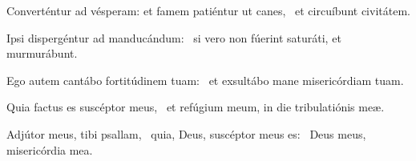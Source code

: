 \item Converténtur ad vésperam: et famem patiéntur ut canes,~\psstar{} et circuíbunt civitátem.

\item Ipsi dispergéntur ad manducándum:~\psstar{} si vero non fúerint saturáti, et murmurábunt.

\item Ego autem cantábo fortitúdinem tuam:~\psstar{} et exsultábo mane misericórdiam tuam.

\item Quia factus es suscéptor meus,~\psstar{} et refúgium meum, in die tribulatiónis meæ.

\item Adjútor meus, tibi psallam,~\pscross{} quia, Deus, suscéptor meus es:~\psstar{} Deus meus, misericórdia mea.

